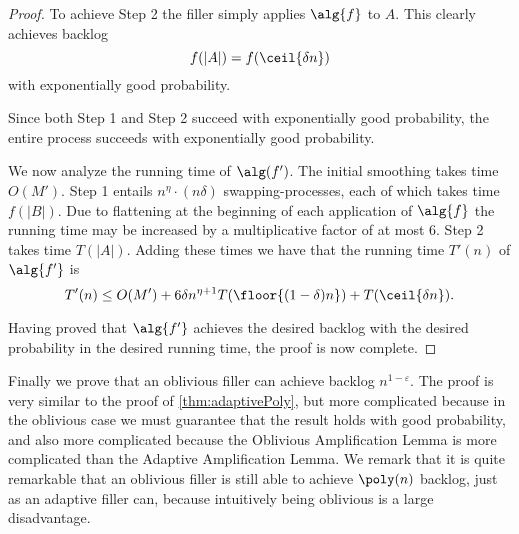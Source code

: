 \begin{proof}
  To achieve Step 2 the filler simply applies $\alg{f}$ to $A$.
  This clearly achieves backlog 
  $$f(|A|) = f(\ceil{\delta n})$$
  with exponentially good probability.
 
  Since both Step 1 and Step 2 succeed with exponentially good
  probability, the entire process succeeds with exponentially
  good probability.

  We now analyze the running time of $\alg(f')$.
  The initial smoothing takes time $O(M')$. Step 1 entails
  $n^{\eta}\cdot (n\delta)$ swapping-processes, each of which
  takes time $f(|B|)$. Due to flattening at the beginning of each
  application of $\alg{f}$ the running time may be increased by a
  multiplicative factor of at most $6$. Step 2 takes time
  $T(|A|)$. Adding these times we have that the running time
  $T'(n)$ of $\alg{f'}$ is
  $$T'(n) \le O(M') + 6 \delta n^{\eta+1} T(\floor{(1-\delta)n}) + T(\ceil{\delta n}).$$

  Having proved that $\alg{f'}$ achieves the desired backlog
  with the desired probability in the desired running time, the
  proof is now complete.

\end{proof}

Finally we prove that an oblivious filler can achieve backlog
$n^{1-\varepsilon}$. 
The proof is very similar to the proof of
\cref{thm:adaptivePoly}, but more complicated because in the
oblivious case we must guarantee that the result holds with good
probability, and also more complicated because the Oblivious
Amplification Lemma is more complicated than the Adaptive
Amplification Lemma. We remark that it is quite remarkable that
an oblivious filler is still able to achieve $\poly(n)$ backlog, just as
an adaptive filler can, because intuitively being oblivious is a
large disadvantage.

